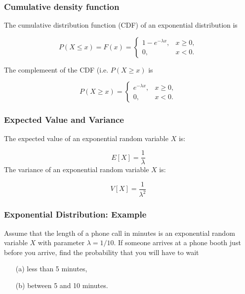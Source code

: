 \documentclass[IntroMain.tex]{subfiles}
\begin{document}
\begin{frame}[fragile]
	\frametitle{Cumulative density function}
	The cumulative distribution function (CDF) of an exponential distribution is
	
	\[
	P(X \leq x) = F(x) = \begin{cases}
	1-e^{-\lambda x}, & x \ge 0, \\
	0, & x < 0.
	\end{cases}\]
	
	
	The complemeent of the CDF (i.e. $P(X \geq x)$ is
	
	\[
	P(X \geq x) = \begin{cases}
	e^{-\lambda x}, & x \ge 0, \\
	0, & x < 0.
	\end{cases}\]
\end{frame}

\begin{frame}[fragile]
	\frametitle{Expected Value and Variance}
	The expected value of an exponential random variable $X$ is:
	
	\[
	E[X] = \frac{1}{\lambda}\]
	The variance of an exponential random variable $X$ is:
	
	\[
	V[X] = \frac{1}{\lambda^2}\]
	
\end{frame}

\begin{frame}[fragile]
	\frametitle{Exponential Distribution: Example}
	Assume that the length of a phone call in minutes is an exponential random variable $X$ with parameter
	$\lambda = 1/10$. If someone arrives at a phone booth just before you arrive, find the probability that you
	will have to wait \begin{itemize}
		\item[(a)] less than 5 minutes,
		\item[(b)] between 5 and 10 minutes.
	\end{itemize}
\end{frame}



\end{document}
